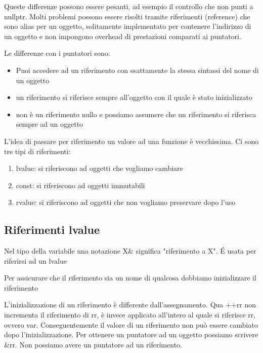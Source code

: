 \documentclass[11pt,a4paper]{book}
\begin{document}
Queste differenze possono essere pesanti, ad esempio il controllo che non punti a nullptr. Molti problemi possono essere risolti tramite riferimenti (reference) che sono alias per un oggetto, solitamente implementato per contenere l'indirizzo di un oggetto e non impongono overhead di prestazioni comparati ai puntatori.

Le differenze con i puntatori sono:
\begin{itemize}
	\item Puoi accedere ad un riferimento con esattamente la stessa sintassi del nome di un oggetto
	\item un riferimento si riferisce sempre all'oggetto con il quale è stato inizializzato
	\item non è un riferimento nullo e possiamo assumere che un riferimento si riferisca sempre ad un oggetto
\end{itemize}

\label{code: 096}

L'idea di passare per riferimento un valore ad una funzione è vecchissima. Ci sono tre tipi di riferimenti:
\begin{enumerate}
	\item lvalue: si riferiscono ad oggetti che vogliamo cambiare
	\item const: si riferiscono ad oggetti immutabili
	\item rvalue: si riferiscono ad oggetti che non vogliamo preservare dopo l'uso
\end{enumerate}

\subsection{Riferimenti lvalue}
Nel tipo della variabile una notazione X\& significa "riferimento a X". É usata per riferirsi ad un lvalue
\label{code: 097}

Per assicurare che il riferimento sia un nome di qualcosa dobbiamo inizializzare il riferimento
\label{code: 098}

L'inizializzazione di un riferimento è differente dall'assegnamento. 
\label{code: 099}
Qua ++rr non incrementa il riferimento di rr, è invece applicato all'intero al quale si riferisce rr, ovvero var. Conseguentemente il valore di un riferimento non può essere cambiato dopo l'inizializzazione. Per ottenere un puntatore ad un oggetto possiamo scrivere \&rr. Non possiamo avere un puntatore ad un riferimento.
\end{document}
